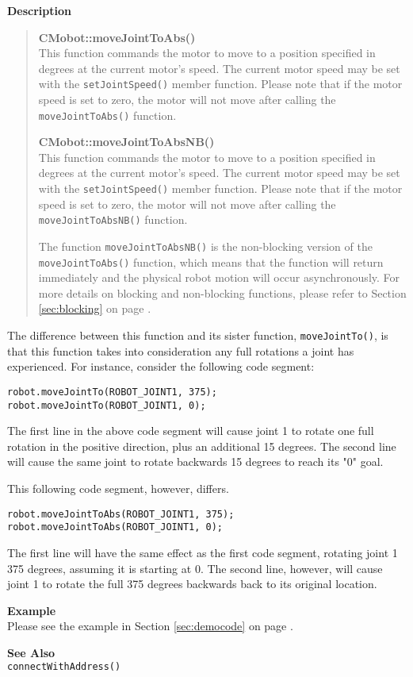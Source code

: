 \noindent
{\bf Description}\\
\vspace{-12pt}
\begin{quote}
{\bf CMobot::moveJointToAbs()}\\
This function commands the motor to move to a position specified in degrees at
the current motor's speed. The current motor speed may be set with the
\texttt{setJointSpeed()} member function. Please note that if the motor speed
is set to zero, the motor will not move after calling the
\texttt{moveJointToAbs()} function. 

{\bf CMobot::moveJointToAbsNB()}\\
This function commands the motor to move to a position specified in degrees at
the current motor's speed. The current motor speed may be set with the
\texttt{setJointSpeed()} member function. Please note that if the motor speed
is set to zero, the motor will not move after calling the
\texttt{moveJointToAbsNB()} function. 

The function \texttt{moveJointToAbsNB()} is the non-blocking version of
the \texttt{moveJointToAbs()} function, which means that the function will return
immediately and the physical robot motion will occur asynchronously. For
more details on blocking and non-blocking functions, please refer to 
Section \ref{sec:blocking} on page \pageref{sec:blocking}.\\
\end{quote}

The difference between this function and its sister function, \texttt{moveJointTo()},
is that this function takes into consideration any full rotations a joint has 
experienced. For instance, consider the following code segment:
\begin{verbatim}
robot.moveJointTo(ROBOT_JOINT1, 375);
robot.moveJointTo(ROBOT_JOINT1, 0);
\end{verbatim}
The first line in the above code segment will cause joint 1 to rotate one full
rotation in the positive direction, plus an additional 15 degrees. The second
line will cause the same joint to rotate backwards 15 degrees to reach its "0"
goal.

This following code segment, however, differs.
\begin{verbatim}
robot.moveJointToAbs(ROBOT_JOINT1, 375);
robot.moveJointToAbs(ROBOT_JOINT1, 0);
\end{verbatim}
The first line will have the same effect as the first code segment, rotating
joint 1 375 degrees, assuming it is starting at 0. The second line, however,
will cause joint 1 to rotate the full 375 degrees backwards back to its original 
location.

\noindent
{\bf Example}\\
Please see the example in Section \ref{sec:democode} on page \pageref{sec:democode}.\\
\noindent

\noindent
{\bf See Also}\\
\texttt{connectWithAddress()}

